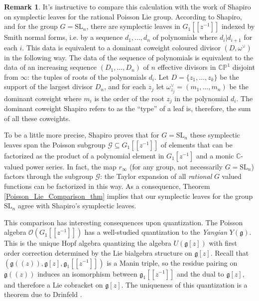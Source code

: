 \documentclass[11pt, oneside, reqno]{amsart}
\theoremstyle{definition} \newtheorem{definition}{Definition}[section]
\theoremstyle{definition} \newtheorem{remark}[definition]{Remark}
\theoremstyle{definition} \newtheorem{remarks}[definition]{Remarks}
\theoremstyle{definition} \newtheorem{question}[definition]{Question}
\theoremstyle{definition} \newtheorem*{note}{Note}
\theoremstyle{definition} \newtheorem{example}[definition]{Example}
\theoremstyle{definition} \newtheorem{examples}[definition]{Examples}
\renewcommand{\gg}{\mathfrak{g}}
\newcommand{\bb}[1]{\mathbb{#1}}
\newcommand{\mc}[1]{\mathcal{#1}}
\newcommand{\CC}{\mathbb{C}}
\newcommand{\OO}{\mathcal{O}}
\newcommand{\SL}{\mathrm{SL}}
\newcommand{\sub}{\subseteq}
\begin{document}
\begin{remark} \label{shapiro_leaves_remark}
It's instructive to compare this calculation with the work of Shapiro \cite{Shapiro} on symplectic leaves for the rational Poisson Lie group.  According to Shapiro, and for the group $G = \SL_n$, there are symplectic leaves in $G_1[[z^{-1}]]$ indexed by Smith normal forms, i.e. by a sequence $d_1, \ldots, d_n$ of polynomials where $d_i | d_{i+1}$ for each $i$.  This data is equivalent to a dominant coweight coloured divisor $(D,\omega^\vee)$ in the following way.  The data of the sequence of polynomials is equivalent to the data of an increasing sequence $(D_1, \ldots, D_n)$ of $n$ effective divisors in $\bb{CP}^1$ disjoint from $\infty$: the tuples of roots of the polynomials $d_i$.  Let $D = \{z_1, \ldots, z_k\}$ be the support of the largest divisor $D_n$, and for each $z_j$ let $\omega^\vee_{z_j} = (m_1, \ldots, m_n)$ be the dominant coweight where $m_i$ is the order of the root $z_j$ in the polynomial $d_i$.  The dominant coweight Shapiro refers to as the ``type'' of a leaf is, therefore, the sum of all these coweights.

To be a little more precise, Shapiro proves that for $G = \SL_n$ these symplectic leaves span the Poisson subgroup $\mc G \sub G_1[[z^{-1}]]$ of elements that can be factorized as the product of a polynomial element in $G_1[z^{-1}]$ and a monic $\CC$-valued power series.  In fact, the map $r_\infty$ (for any group, not necessarily $G = \SL_n$) factors through the subgroup $\mc G$: the Taylor expansion of all \emph{rational} $G$ valued functions can be factorized in this way.  As a consequence, Theorem \ref{Poisson_Lie_Comparison_thm} implies that our symplectic leaves for the group $\SL_n$ agree with Shapiro's symplectic leaves.
\end{remark}

This comparison has interesting consequences upon quantization.  The Poisson algebra $\OO(G_1[[z^{-1}]])$ has a well-studied quantization to the \emph{Yangian} $Y(\gg)$.  This is the unique Hopf algebra quantizing the algebra $U(\gg[z])$ with first order correction determined by the Lie bialgebra structure on $\gg[z]$.  Recall that $(\gg(\!(z)\!), \gg[z], \gg_1[[z^{-1}]])$ is a Manin triple, so the residue pairing on $\gg(\!(z)\!)$ induces an isomorphism between $\gg_1[[z^{-1}]]$ and the dual to $\gg[z]$, and therefore a Lie cobracket on $\gg[z]$.  The uniqueness of this quantization is a theorem due to Drinfeld {\cite[Theorem 2]{DrinfeldQuantum1}}.
\end{document}
